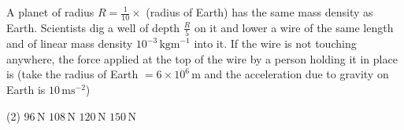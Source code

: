 
\item A planet of radius \( R = \frac{1}{10} \times \) (radius of Earth) has the same mass density as Earth. Scientists dig a well of depth \( \frac{R}{5} \) on it and lower a wire of the same length and of linear mass density \( 10^{-3} \, \text{kgm}^{-1} \) into it. If the wire is not touching anywhere, the force applied at the top of the wire by a person holding it in place is (take the radius of Earth \( = 6 \times 10^6 \, \text{m} \) and the acceleration due to gravity on Earth is \( 10 \, \text{ms}^{-2} \))
\begin{tasks}(2)
    \task \( 96 \, \text{N} \)
    \task \( 108 \, \text{N} \)
    \task \( 120 \, \text{N} \)\ans
    \task \( 150 \, \text{N} \)
\end{tasks}
